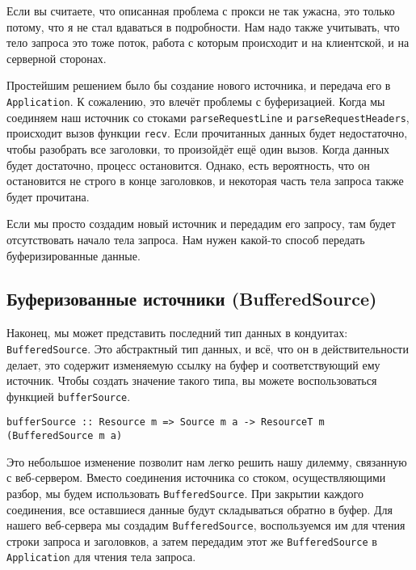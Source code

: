 \begin{remark}
Если вы считаете, что описанная проблема с прокси не так ужасна, это только потому, что
я не стал вдаваться в подробности.
Нам надо также учитывать, что тело запроса это тоже поток,
работа с которым происходит и на клиентской, и на серверной сторонах.
\end{remark}

Простейшим решением было бы создание нового источника, и передача его в \lstinline{Application}.
К сожалению, это влечёт проблемы с буферизацией. Когда мы соединяем
наш источник со стоками \lstinline'parseRequestLine' и \lstinline'parseRequestHeaders',
происходит вызов функции \lstinline'recv'.
Если прочитанных данных будет недостаточно, чтобы разобрать все заголовки, то
произойдёт ещё один вызов. Когда данных будет достаточно, процесс остановится.
Однако, есть вероятность, что он остановится не строго в конце заголовков, и некоторая
часть тела запроса также будет прочитана.

Если мы просто создадим новый источник и передадим его запросу, там будет
отсутствовать начало тела запроса. Нам нужен какой-то способ передать
буферизированные данные.

\subsection{Буферизованные источники (BufferedSource)}


Наконец, мы может представить последний тип данных в кондуитах:
\lstinline'BufferedSource'. Это абстрактный тип данных, и всё, что он в
действительности делает, это содержит изменяемую ссылку на буфер и
соответствующий ему источник. Чтобы создать значение такого типа, вы можете
воспользоваться функцией \lstinline'bufferSource'.
\begin{lstlisting}
bufferSource :: Resource m => Source m a -> ResourceT m (BufferedSource m a)
\end{lstlisting}
Это небольшое изменение позволит нам легко решить нашу дилемму, связанную с
веб-сервером. Вместо соединения источника со стоком, осуществляющими разбор,
мы будем использовать \lstinline'BufferedSource'. При закрытии каждого
соединения, все оставшиеся данные будут складываться обратно в буфер.
Для нашего веб-сервера мы создадим \lstinline'BufferedSource', воспользуемся
им для чтения строки запроса и заголовков, а затем передадим этот же
\lstinline'BufferedSource' в \lstinline{Application} для чтения тела запроса.

